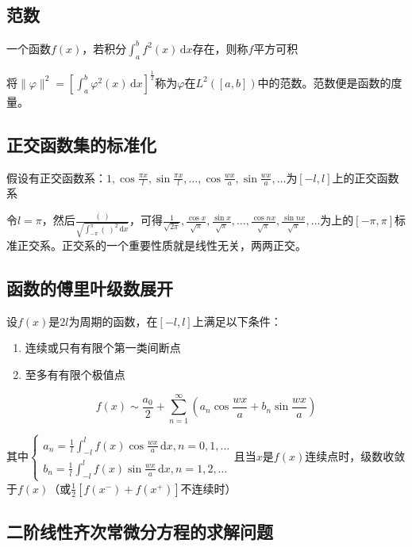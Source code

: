 \subsection{范数}

一个函数\(f(x)\)，若积分\(\int_{a}^{b}{f^2(x)\,\mathrm{d}x}\)存在，则称\(f\)平方可积

将\(\|\varphi\|^2=\left[\int_a^b\varphi^2(x)\,\mathrm{d}x\right]^{\frac{1}{2}}\)称为\(\varphi\)在\(L^2([a,b])\)中的范数。范数便是函数的度量。

\subsection{正交函数集的标准化}

假设有正交函数系：\(1,\cos{\frac{\pi x}{l}},\sin{\frac{\pi x}{l}},\ldots,\cos{\frac{wx}{a}},\sin{\frac{wx}{a}},\ldots\)为\([-l,l]\)上的正交函数系

令\(l=\pi\)，然后\(\frac{(\ )}{\sqrt{\int_{-\pi}^{\pi}{(\ )^2\,\mathrm{d}x}}}\)，可得\(\frac{1}{\sqrt{2\pi}},\frac{\cos{x}}{\sqrt\pi},\frac{\sin{x}}{\sqrt\pi},\ldots,\frac{\cos{nx}}{\sqrt\pi},\frac{\sin{nx}}{\sqrt\pi},\ldots\)为上的\([-\pi,\pi]\)标准正交系。正交系的一个重要性质就是线性无关，两两正交。

\subsection{函数的傅里叶级数展开}

设\(f(x)\)是\(2l\)为周期的函数，在\([-l,l]\)上满足以下条件：
\begin{enumerate}
    \item 连续或只有有限个第一类间断点
    \item 至多有有限个极值点
\end{enumerate}
\[
f(x)\sim\frac{a_0}{2}+\sum_{n=1}^{\infty}{\left(a_n\cos\frac{wx}{a}+b_n\sin\frac{wx}{a}\right)}
\]

其中\(\begin{cases}a_n=\frac{1}{l}\int_{-l}^lf(x)\cos\frac{wx}{a}\,\mathrm{d}x,n=0,1,\ldots\\b_n=\frac{1}{l}\int_{-l}^lf(x)\sin\frac{wx}{a}\,\mathrm{d}x,n=1,2,\ldots\end{cases}\)且当\(x\)是\(f(x)\)连续点时，级数收敛于\(f(x)\)（或\(\frac{1}{2}[f(x^-)+f(x^+)]\)不连续时）
\subsection{二阶线性齐次常微分方程的求解问题}

